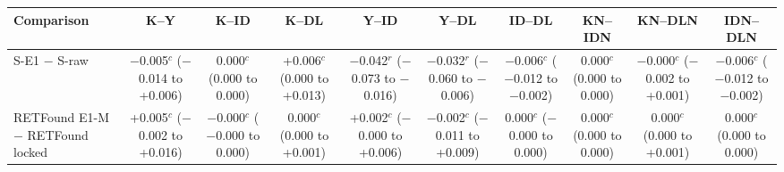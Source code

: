 \begin{tabular}{@{}lccccccccc@{}}
\toprule
Comparison & K--Y & K--ID & K--DL & Y--ID & Y--DL & ID--DL & KN--IDN & KN--DLN & IDN--DLN \\
\midrule
S-E1 $-$ S-raw & \makecell{$-$0.005$^{c}$\\{\scriptsize ($-$0.014 to +0.006)}} & \makecell{0.000$^{c}$\\{\scriptsize (0.000 to 0.000)}} & \makecell{+0.006$^{c}$\\{\scriptsize (0.000 to +0.013)}} & \makecell{$-$0.042$^{r}$\\{\scriptsize ($-$0.073 to $-$0.016)}} & \makecell{$-$0.032$^{r}$\\{\scriptsize ($-$0.060 to $-$0.006)}} & \makecell{$-$0.006$^{c}$\\{\scriptsize ($-$0.012 to $-$0.002)}} & \makecell{0.000$^{c}$\\{\scriptsize (0.000 to 0.000)}} & \makecell{$-$0.000$^{c}$\\{\scriptsize ($-$0.002 to +0.001)}} & \makecell{$-$0.006$^{c}$\\{\scriptsize ($-$0.012 to $-$0.002)}} \\
RETFound E1-M $-$ RETFound locked & \makecell{+0.005$^{c}$\\{\scriptsize ($-$0.002 to +0.016)}} & \makecell{$-$0.000$^{c}$\\{\scriptsize ($-$0.000 to 0.000)}} & \makecell{0.000$^{c}$\\{\scriptsize (0.000 to +0.001)}} & \makecell{+0.002$^{c}$\\{\scriptsize ($-$0.000 to +0.006)}} & \makecell{$-$0.002$^{c}$\\{\scriptsize ($-$0.011 to +0.009)}} & \makecell{0.000$^{c}$\\{\scriptsize ($-$0.000 to 0.000)}} & \makecell{0.000$^{c}$\\{\scriptsize (0.000 to 0.000)}} & \makecell{0.000$^{c}$\\{\scriptsize (0.000 to +0.001)}} & \makecell{0.000$^{c}$\\{\scriptsize (0.000 to 0.000)}} \\

\end{tabular}
